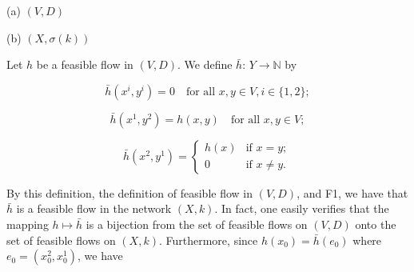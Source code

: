 (a) $(V, D)$

(b) $(X, \sigma(k))$

Let $h$ be a feasible flow in $(V, D)$. We define $\bar{h}$: $Y \rightarrow \mathbb{N}$ by

$$\bar{h}(x^i, y^i) = 0 \quad \text{for all } x, y \in V, i \in \{1, 2\};$$

$$\bar{h}(x^1, y^2) = h(x, y) \quad \text{for all } x, y \in V;$$

$$\bar{h}(x^2, y^1) = \begin{cases} h(x) & \text{if } x = y; \\ 0 & \text{if } x \neq y. \end{cases}$$

By this definition, the definition of feasible flow in $(V, D)$, and F1, we have that $\bar{h}$ is a feasible flow in the network $(X, k)$. In fact, one easily verifies that the mapping $h \mapsto \bar{h}$ is a bijection from the set of feasible flows on $(V, D)$ onto the set of feasible flows on $(X, k)$. Furthermore, since $h(x_0) = \bar{h}(e_0)$ where $e_0 = (x_0^2, x_0^1)$, we have
